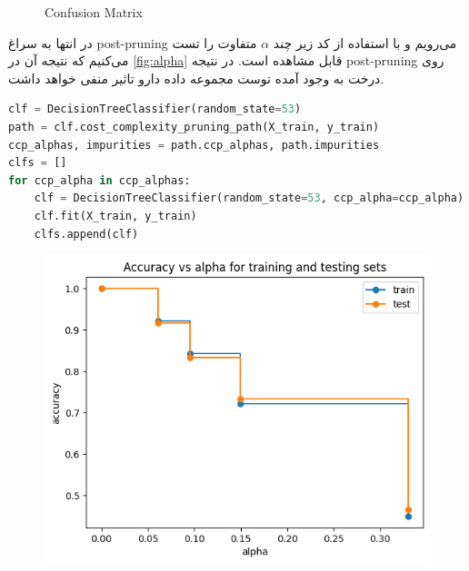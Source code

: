 \documentclass{article}
\begin{document}
\begin{figure}[H] 
	\centering
	\caption{Confusion Matrix}
	\label{fig: Q3 best cm}
\end{figure}

در انتها به سراغ 
post-pruning
می‌رویم و با استفاده از کد زیر چند 
$\alpha$
متفاوت را تست می‌کنیم که نتیجه آن در 
\autoref{fig:alpha}
قابل مشاهده است. در نتیجه 
post-pruning 
روی درخت به وجود آمده توست مجموعه داده دارو تاثیر منفی خواهد داشت.
\begin{LTR}
	\begin{lstlisting}[language=Python, caption=best alpha]
clf = DecisionTreeClassifier(random_state=53)
path = clf.cost_complexity_pruning_path(X_train, y_train)
ccp_alphas, impurities = path.ccp_alphas, path.impurities
clfs = []
for ccp_alpha in ccp_alphas:
    clf = DecisionTreeClassifier(random_state=53, ccp_alpha=ccp_alpha)
    clf.fit(X_train, y_train)
    clfs.append(clf)
	\end{lstlisting}
\end{LTR}
\begin{figure}[H]
\centering
\includegraphics[width=0.7\linewidth]{img/Q3/alpha}
\caption{}
\label{fig:alpha}
\end{figure}
\end{document}
